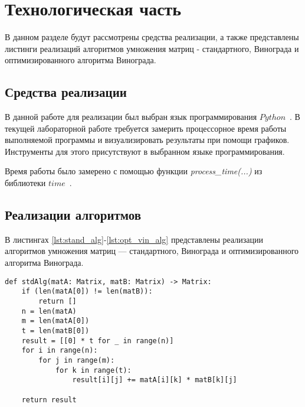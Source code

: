 \chapter{Технологическая часть}

В данном разделе будут рассмотрены средства реализации, а также представлены листинги реализаций алгоритмов умножения матриц - стандартного, Винограда и оптимизированного алгоритма Винограда.

\section{Средства реализации}
В данной работе для реализации был выбран язык программирования $Python$~\cite{python-lang}. В текущей лабораторной работе требуется замерить процессорное время работы выполняемой программы и визуализировать результаты при помощи графиков. Инструменты для этого присутствуют в выбранном языке программирования.

Время работы было замерено с помощью функции \textit{process\_time(...)} из библиотеки $time$~\cite{python-lang-time}.


\section{Реализации алгоритмов}

В листингах \ref{lst:stand_alg}-\ref{lst:opt_vin_alg} представлены реализации алгоритмов умножения матриц --- стандартного, Винограда и оптимизированного алгоритма Винограда.

\begin{center}
    \captionsetup{justification=raggedright,singlelinecheck=off}
    \begin{lstlisting}[label=lst:stand_alg,caption=Реализация стандартного алгоритма умножения матриц]
def stdAlg(matA: Matrix, matB: Matrix) -> Matrix:
	if (len(matA[0]) != len(matB)):
		return []
	n = len(matA)
	m = len(matA[0])
	t = len(matB[0])
	result = [[0] * t for _ in range(n)]
	for i in range(n):
		for j in range(m):
			for k in range(t):
				result[i][j] += matA[i][k] * matB[k][j]
	
	return result
\end{lstlisting}
\end{center}


